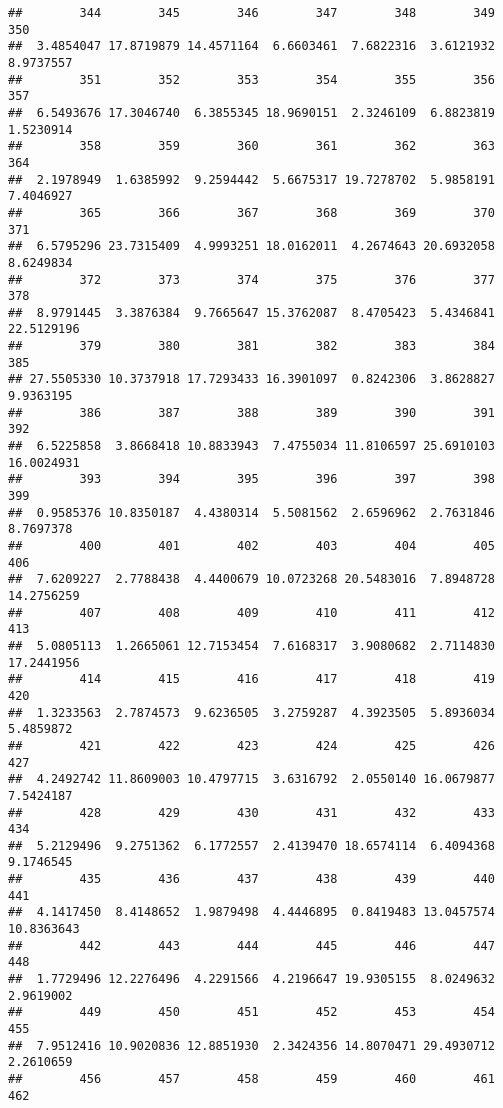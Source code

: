 \documentclass[
]{article}
\begin{document}
\begin{verbatim}
##        344        345        346        347        348        349        350 
##  3.4854047 17.8719879 14.4571164  6.6603461  7.6822316  3.6121932  8.9737557 
##        351        352        353        354        355        356        357 
##  6.5493676 17.3046740  6.3855345 18.9690151  2.3246109  6.8823819  1.5230914 
##        358        359        360        361        362        363        364 
##  2.1978949  1.6385992  9.2594442  5.6675317 19.7278702  5.9858191  7.4046927 
##        365        366        367        368        369        370        371 
##  6.5795296 23.7315409  4.9993251 18.0162011  4.2674643 20.6932058  8.6249834 
##        372        373        374        375        376        377        378 
##  8.9791445  3.3876384  9.7665647 15.3762087  8.4705423  5.4346841 22.5129196 
##        379        380        381        382        383        384        385 
## 27.5505330 10.3737918 17.7293433 16.3901097  0.8242306  3.8628827  9.9363195 
##        386        387        388        389        390        391        392 
##  6.5225858  3.8668418 10.8833943  7.4755034 11.8106597 25.6910103 16.0024931 
##        393        394        395        396        397        398        399 
##  0.9585376 10.8350187  4.4380314  5.5081562  2.6596962  2.7631846  8.7697378 
##        400        401        402        403        404        405        406 
##  7.6209227  2.7788438  4.4400679 10.0723268 20.5483016  7.8948728 14.2756259 
##        407        408        409        410        411        412        413 
##  5.0805113  1.2665061 12.7153454  7.6168317  3.9080682  2.7114830 17.2441956 
##        414        415        416        417        418        419        420 
##  1.3233563  2.7874573  9.6236505  3.2759287  4.3923505  5.8936034  5.4859872 
##        421        422        423        424        425        426        427 
##  4.2492742 11.8609003 10.4797715  3.6316792  2.0550140 16.0679877  7.5424187 
##        428        429        430        431        432        433        434 
##  5.2129496  9.2751362  6.1772557  2.4139470 18.6574114  6.4094368  9.1746545 
##        435        436        437        438        439        440        441 
##  4.1417450  8.4148652  1.9879498  4.4446895  0.8419483 13.0457574 10.8363643 
##        442        443        444        445        446        447        448 
##  1.7729496 12.2276496  4.2291566  4.2196647 19.9305155  8.0249632  2.9619002 
##        449        450        451        452        453        454        455 
##  7.9512416 10.9020836 12.8851930  2.3424356 14.8070471 29.4930712  2.2610659 
##        456        457        458        459        460        461        462 

\end{verbatim}
\end{document}
